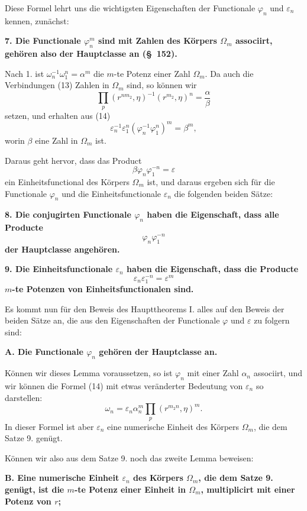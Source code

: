 \documentclass[11pt]{article}
\providecommand{\eps}{\varepsilon}
\providecommand{\eps}{\varepsilon}
\begin{document}
Diese Formel lehrt uns die wichtigsten Eigenschaften der Functionale $\varphi_n$ und $\eps_n$ kennen, zunächst:

\textbf{7. Die Functionale $\varphi_n^m$ sind mit Zahlen des Körpers $\Omega_m$ associirt, gehören also der Hauptclasse an (\S~152).}

Nach 1. ist $\omega_n^{-1}\omega_1^n=\alpha^m$ die $m$-te Potenz einer Zahl $\Omega_m$. Da auch die Verbindungen (13) Zahlen in $\Omega_m$ sind, so können wir
\[
  \prod_p(r^{nm_2},\eta)^{-1}(r^{m_2},\eta)^n=\frac{\alpha}{\beta}
\]
setzen, und erhalten aus (14)
\[
  \eps_n^{-1}\eps_1^n(\varphi_n^{-1}\varphi_1^n)^m=\beta^m,
\]
worin $\beta$ eine Zahl in $\Omega_m$ ist.

Daraus geht hervor, dass das Product
\[
  \beta\varphi_n\varphi_1^{-n}=\eps
\]
ein Einheitsfunctional des Körpers $\Omega_m$ ist, und daraus ergeben sich für die Functionale $\varphi_n$ und die Einheitsfunctionale $\eps_n$ die folgenden beiden Sätze:

\textbf{8. Die conjugirten Functionale $\varphi_n$ haben die Eigenschaft, dass alle Producte}
\[
  \varphi_n\varphi_1^{-n}
\]
\textbf{der Hauptclasse angehören.}

\textbf{9. Die Einheitsfunctionale $\eps_n$ haben die Eigenschaft, dass die Producte}
\[
  \eps_n\eps_1^{-n}=\eps^m
\]
\textbf{$m$-te Potenzen von Einheitsfunctionalen sind.}

Es kommt nun für den Beweis des Haupttheorems I. alles auf den Beweis der beiden Sätze an, die aus den Eigenschaften der Functionale $\varphi$ und $\eps$ zu folgern sind:

\textbf{A. Die Functionale $\varphi_n$ gehören der Hauptclasse an.}

Können wir dieses Lemma voraussetzen, so ist $\varphi_n$ mit einer Zahl $\alpha_n$ associirt, und wir können die Formel (14) mit etwas veränderter Bedeutung von $\eps_n$ so darstellen:
\begin{equation}
  \omega_n=\eps_n\alpha_n^m\prod_p(r^{m_2 n},\eta)^m.
\tag{15}
\end{equation}
In dieser Formel ist aber $\eps_n$ eine numerische Einheit des Körpers $\Omega_m$, die dem Satze 9. genügt.

Können wir also aus dem Satze 9. noch das zweite Lemma beweisen:

\textbf{B. Eine numerische Einheit $\eps_n$ des Körpers $\Omega_m$, die dem Satze 9. genügt, ist die $m$-te Potenz einer Einheit in $\Omega_m$, multiplicirt mit einer Potenz von $r$;}
\end{document}
